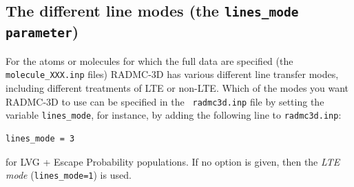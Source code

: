 \documentclass{report}
\begin{document}
\subsection{The different line modes (the {\small\tt lines\_mode parameter})}
\label{sec-lines-mode}
%
For the atoms or molecules for which the full data are specified (the
{\small\tt molecule\_XXX.inp} files) RADMC-3D has various different line
transfer modes, including different treatments of LTE or non-LTE. Which of
the modes you want RADMC-3D to use can be specified in the {\small\tt
  radmc3d.inp} file by setting the variable {\small\tt lines\_mode}, for
instance, by adding the following line to {\small\tt radmc3d.inp}:
{\small\begin{verbatim}
lines_mode = 3
\end{verbatim}}
for LVG + Escape Probability populations. If no option is given, then the {\em LTE mode} 
({\small\tt lines\_mode=1}) is used. 
\end{document}
